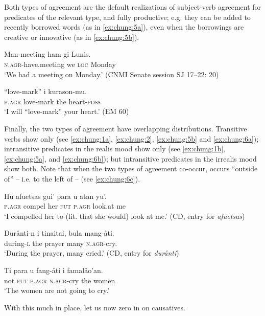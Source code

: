 \documentclass[output=paper,
modfonts
]{LSP/langsci}
\begin{document}
\begin{exe}
\begin{xlist}
Both types of agreement are the default realizations of subject-verb
agreement for predicates of the relevant type, and fully productive;
e.g. they can be added to recently borrowed words (as in \ref{ex:chung:5a}), even
when the borrowings are creative or innovative (as in \ref{ex:chung:5b}).

\ea \label{ex:chung:5}
\ea \label{ex:chung:5a}
\gll Man-meeting ham gi Lunis.\\
\textsc{n.agr-}have.meeting we \textsc{loc} Monday\\
\glt `We had a meeting on Monday.' (CNMI Senate session SJ 17--22: 20)

\ex \label{ex:chung:5b}  ``love-mark'' i kurason-mu.\\
\textsc{p.agr} love-mark the heart-\textsc{poss}\\
\glt `I will ``love-mark'' your heart.' (EM 60)
\z
\z

Finally, the two types of agreement have overlapping distributions.
Transitive verbs show only  (see \ref{ex:chung:1a}, \ref{ex:chung:2},
\ref{ex:chung:5b} and \ref{ex:chung:6a}); intransitive predicates in the realis mood show only
 (see \ref{ex:chung:1b}, \ref{ex:chung:5a}, and \ref{ex:chung:6b}); but intransitive predicates
in the irrealis mood show both. Note that when the two types of
agreement co-occur,  occurs ``outside
of'' -- i.e. to the left of --  (see \ref{ex:chung:6c}).

\ea \label{ex:chung:6}
\ea \label{ex:chung:6a}
\gll Hu afuetsas gui' para u atan yu'.\\
\textsc{p.agr} compel her \textsc{fut} \textsc{p.agr} look.at me\\
\glt `I compelled her to (lit. that she would) look at me.' (CD, entry for \emph{afuetsas})

\ex \label{ex:chung:6b} \gll Durånti-n i tinaitai, bula mang-åti.\\
during-\textsc{l} the prayer many \textsc{n.agr}-cry.\\
\glt `During the prayer, many cried.' (CD, entry for \emph{durånti})

\ex \label{ex:chung:6c} \gll Ti para u fang-åti i famalåo'an.\\
not \textsc{fut} \textsc{p.agr} \textsc{n.agr}-cry the women\\
\glt `The women are not going to cry.'
\z
\z 

With this much in place, let us now zero in on causatives.


\end{xlist}
\end{exe}
\end{document}
